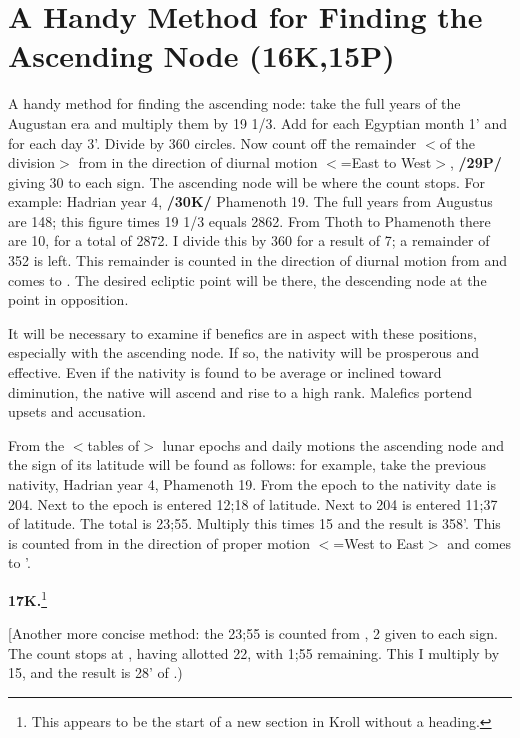 \section{A Handy Method for Finding the Ascending Node (16K,15P)}

A handy method for finding the ascending node: take the full years of the Augustan era and multiply them by 19 1/3. Add for each Egyptian month 1\deg\xspace 35' and for each day 3'. Divide by 360\deg\xspace circles. Now count off the remainder $<$of the division$>$ from \Cancer\xspace in the direction of diurnal motion $<$=East to West$>$, \textbf{/29P/} giving 30 to each sign. The ascending node will be where the count stops. For example: Hadrian year 4, \textbf{/30K/} Phamenoth 19. The full years from Augustus are 148; this figure times 19 1/3 equals 2862. From Thoth to Phamenoth there are 10\deg, for a total of 2872. I divide this by 360\deg\xspace for a result of 7; a remainder of 352 is left. This remainder is counted in the direction of diurnal motion from \Cancer\xspace and comes to \deg. The desired ecliptic point will be there, the descending node at the point in opposition.

\mndl[0.2cm]
It will be necessary to examine if benefics are in aspect with these positions, especially with the ascending node. If so, the nativity will be prosperous and effective. Even if the nativity is found to be average or inclined toward diminution, the native will ascend and rise to a high rank. Malefics portend
upsets and accusation.

From the $<$tables of$>$ lunar epochs and daily motions the ascending node and the sign of its latitude will be found as follows: for example, take the previous nativity, Hadrian year 4, Phamenoth 19. From the epoch to the nativity date is 204. Next to the epoch is entered 12;18 of latitude. Next to 204 is entered 11;37 of latitude. The total is 23;55. Multiply this times 15\deg\xspace and the result is 358\deg\xspace 45'. This is counted from \Leo\xspace in the direction of proper motion $<$=West to East$>$ and comes to \Cancer\xspace 28\deg\xspace 45'.

\textbf{17K.}\footnote{This appears to be the start of a new section in Kroll without a heading.}
\setcounter{section}{17}

[Another more concise method: the 23;55 is counted from \Leo, 2 given to each sign. The count stops at \Gemini, having allotted 22, with 1;55 remaining. This I multiply by 15\deg, and the result is 28\deg\xspace 45' of \Cancer.)

